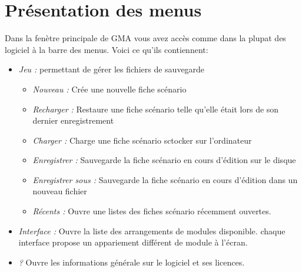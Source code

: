 \documentclass[12pt]{article}
\begin{document}
\section{Présentation des menus}\label{menu}
Dans la fenètre principale de GMA vous avez accès comme dans la plupat des logiciel à la barre des menus. Voici ce qu'ils contiennent:
\begin{itemize}
    \item \emph{Jeu :} permettant de gérer les fichiers de sauvegarde
    \begin{itemize}
        \item \emph{Nouveau :} Crée une nouvelle fiche scénario
        \item \emph{Recharger :} Restaure une fiche scénario telle qu'elle était lors de son dernier enregistrement
        \item \emph{Charger :} Charge une fiche scénario sctocker sur l'ordinateur
        \item \emph{Enregistrer :} Sauvegarde la fiche scénario en cours d'édition sur le disque
        \item \emph{Enregistrer sous :} Sauvegarde la fiche scénario en cours d'édition dans un nouveau fichier
        \item \emph{Récents :} Ouvre une listes des fiches scénario récemment ouvertes.
    \end{itemize} 
    \item \emph{Interface :} Ouvre la liste des arrangements de modules disponible. chaque interface propose un appariement différent de module à l'écran.
    \item \emph{?} Ouvre les informations générale sur le logiciel et ses licences.
\end{itemize}
\end{document}
